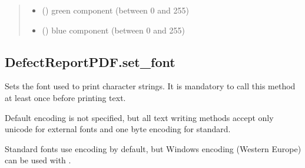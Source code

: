 \documentclass[letterpaper,10pt,english]{sphinxmanual}
\begin{document}
\begin{fulllineitems}
\begin{fulllineitems}
\begin{quote}
\begin{description}
\begin{itemize}
\item {} 
\sphinxAtStartPar
{} () \textendash{} green component (between 0 and 255)

\item {} 
\sphinxAtStartPar
{} () \textendash{} blue component (between 0 and 255)

\end{itemize}

\end{description}\end{quote}

\end{fulllineitems}



\subsection{DefectReportPDF.set\_font}
\label{\detokenize{generated/quality_assessment.quality_pdf_report.DefectReportPDF.set_font:defectreportpdf-set-font}}\label{\detokenize{generated/quality_assessment.quality_pdf_report.DefectReportPDF.set_font::doc}}

\begin{fulllineitems}
\label{\detokenize{generated/quality_assessment.quality_pdf_report.DefectReportPDF.set_font:quality_assessment.quality_pdf_report.DefectReportPDF.set_font}}
\sphinxAtStartPar
Sets the font used to print character strings.
It is mandatory to call this method at least once before printing text.

\sphinxAtStartPar
Default encoding is not specified, but all text writing methods accept only
unicode for external fonts and one byte encoding for standard.

\sphinxAtStartPar
Standard fonts use  encoding by default, but Windows
encoding  (Western Europe) can be used with
.


\end{fulllineitems}
\end{fulllineitems}
\end{document}
